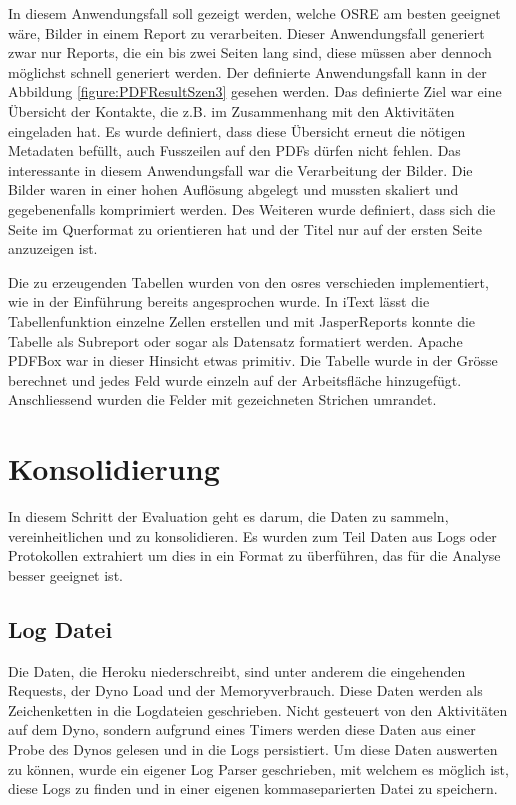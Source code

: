 \documentclass[main.tex]{subfiles}
\begin{document}
In diesem Anwendungsfall soll gezeigt werden, welche OSRE am besten geeignet wäre, Bilder in einem Report zu verarbeiten. Dieser Anwendungsfall generiert zwar nur Reports, die ein bis zwei Seiten lang sind, diese müssen aber dennoch möglichst schnell generiert werden. Der definierte Anwendungsfall kann in der Abbildung \ref{figure:PDFResultSzen3} gesehen werden. Das definierte Ziel war eine Übersicht der Kontakte, die z.B. im Zusammenhang mit den Aktivitäten eingeladen hat. Es wurde definiert, dass diese Übersicht erneut die nötigen Metadaten befüllt, auch Fusszeilen auf den PDFs dürfen nicht fehlen. Das interessante in diesem Anwendungsfall war die Verarbeitung der Bilder. Die Bilder waren in einer hohen Auflösung abgelegt und mussten skaliert und gegebenenfalls komprimiert werden. Des Weiteren wurde definiert, dass sich die Seite im Querformat zu orientieren hat und der Titel nur auf der ersten Seite anzuzeigen ist.

Die zu erzeugenden Tabellen wurden von den \acrshort{osre}s verschieden implementiert, wie in der Einführung bereits angesprochen wurde. In iText lässt die Tabellenfunktion einzelne Zellen erstellen und mit JasperReports konnte die Tabelle als Subreport oder sogar als Datensatz formatiert werden. Apache PDFBox war in dieser Hinsicht etwas primitiv. Die Tabelle wurde in der Grösse berechnet und jedes Feld wurde einzeln auf der Arbeitsfläche hinzugefügt. Anschliessend wurden die Felder mit gezeichneten Strichen umrandet.




\section{Konsolidierung}
In diesem Schritt der Evaluation geht es darum, die Daten zu sammeln, vereinheitlichen und zu konsolidieren. Es wurden zum Teil Daten aus Logs oder Protokollen extrahiert um dies in ein Format zu überführen, das für die  Analyse besser geeignet ist.

\subsection{Log Datei}

Die Daten, die Heroku niederschreibt, sind unter anderem die eingehenden Requests, der Dyno Load und der Memoryverbrauch. Diese Daten werden als Zeichenketten in die Logdateien geschrieben. Nicht gesteuert von den Aktivitäten auf dem Dyno, sondern aufgrund eines Timers werden diese Daten aus einer Probe des Dynos gelesen und in die Logs persistiert. Um diese Daten auswerten zu können, wurde ein eigener Log Parser geschrieben, mit welchem es möglich ist, diese Logs zu finden und in einer eigenen kommaseparierten Datei zu speichern.
\end{document}
